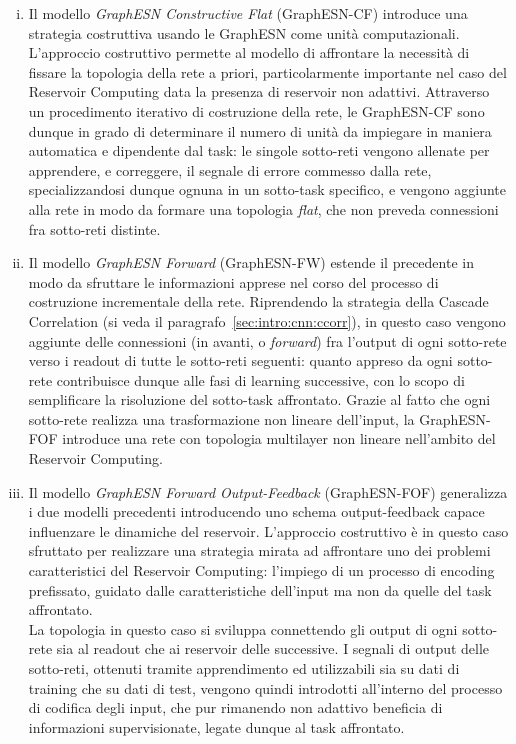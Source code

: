 \begin{enumerate}[(i)]
\item Il modello \emph{GraphESN Constructive Flat} (GraphESN-CF) introduce una strategia costruttiva usando le GraphESN come unità computazionali. L'approccio costruttivo permette al modello di affrontare la necessità di fissare la topologia della rete a priori, particolarmente importante nel caso del Reservoir Computing data la presenza di reservoir non adattivi. Attraverso un procedimento iterativo di costruzione della rete, le GraphESN-CF sono dunque in grado di determinare il numero di unità da impiegare in maniera automatica e dipendente dal task: le singole sotto-reti vengono allenate per apprendere, e correggere, il segnale di errore commesso dalla rete, specializzandosi dunque ognuna in un sotto-task specifico, e vengono aggiunte alla rete in modo da formare una topologia \emph{flat}, che non preveda connessioni fra sotto-reti distinte.

\item Il modello \emph{GraphESN Forward} (GraphESN-FW) estende il precedente in modo da sfruttare le informazioni apprese nel corso del processo di costruzione incrementale della rete. Riprendendo la strategia della Cascade Correlation (si veda il paragrafo~\ref{sec:intro:cnn:ccorr}), in questo caso vengono aggiunte delle connessioni (in avanti, o \emph{forward}) fra l'output di ogni sotto-rete verso i readout di tutte le sotto-reti seguenti: quanto appreso da ogni sotto-rete contribuisce dunque alle fasi di learning successive, con lo scopo di semplificare la risoluzione del sotto-task affrontato. Grazie al fatto che ogni sotto-rete realizza una trasformazione non lineare dell'input, la GraphESN-FOF introduce una rete con topologia multilayer non lineare nell'ambito del Reservoir Computing.

\item Il modello \emph{GraphESN Forward Output-Feedback} (GraphESN-FOF) generalizza i due modelli precedenti introducendo uno schema output-feedback capace influenzare le dinamiche del reservoir. L'approccio costruttivo è in questo caso sfruttato per realizzare una strategia mirata ad affrontare uno dei problemi caratteristici del Reservoir Computing: l'impiego di un processo di encoding prefissato, guidato dalle caratteristiche dell'input ma non da quelle del task affrontato.\\
La topologia in questo caso si sviluppa connettendo gli output di ogni sotto-rete sia al readout che ai reservoir delle successive. I segnali di output delle sotto-reti, ottenuti tramite apprendimento ed utilizzabili sia su dati di training che su dati di test, vengono quindi introdotti all'interno del processo di codifica degli input, che pur rimanendo non adattivo beneficia di informazioni supervisionate, legate dunque al task affrontato.
\end{enumerate}

